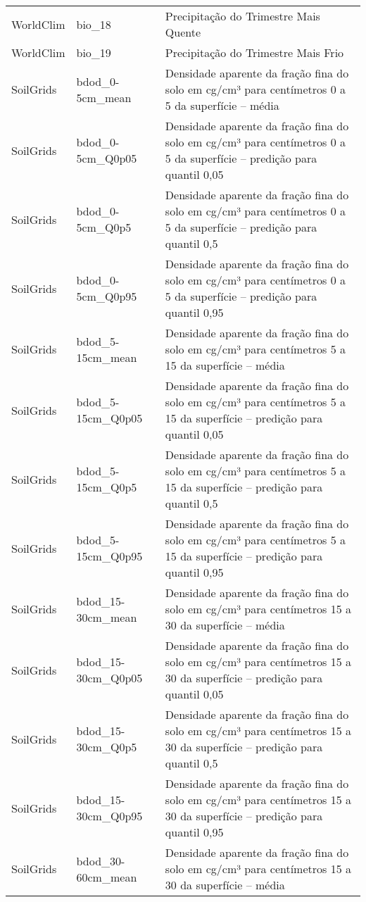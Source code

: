 \begin{longtable}{@{} p{4cm} p{4cm} p{8cm} @{}}
	WorldClim &
	bio\_18 &
	Precipitação do Trimestre Mais Quente \\
	WorldClim &
	bio\_19 &
	Precipitação do Trimestre Mais Frio \\
	SoilGrids &
	bdod\_0-5cm\_mean &
	Densidade aparente da fração fina do solo em cg/cm³ para centímetros 0 a 5 da superfície – média \\
	SoilGrids &
	bdod\_0-5cm\_Q0p05 &
	Densidade aparente da fração fina do solo em cg/cm³ para centímetros 0 a 5 da superfície – predição para quantil 0,05 \\
	SoilGrids &
	bdod\_0-5cm\_Q0p5 &
	Densidade aparente da fração fina do solo em cg/cm³ para centímetros 0 a 5 da superfície – predição para quantil 0,5 \\
	SoilGrids &
	bdod\_0-5cm\_Q0p95 &
	Densidade aparente da fração fina do solo em cg/cm³ para centímetros 0 a 5 da superfície – predição para quantil 0,95 \\
	SoilGrids &
	bdod\_5-15cm\_mean &
	Densidade aparente da fração fina do solo em cg/cm³ para centímetros 5 a 15 da superfície – média \\
	SoilGrids &
	bdod\_5-15cm\_Q0p05 &
	Densidade aparente da fração fina do solo em cg/cm³ para centímetros 5 a 15 da superfície – predição para quantil 0,05 \\
	SoilGrids &
	bdod\_5-15cm\_Q0p5 &
	Densidade aparente da fração fina do solo em cg/cm³ para centímetros 5 a 15 da superfície – predição para quantil 0,5 \\
	SoilGrids &
	bdod\_5-15cm\_Q0p95 &
	Densidade aparente da fração fina do solo em cg/cm³ para centímetros 5 a 15 da superfície – predição para quantil 0,95 \\
	SoilGrids &
	bdod\_15-30cm\_mean &
	Densidade aparente da fração fina do solo em cg/cm³ para centímetros 15 a 30 da superfície – média \\
	SoilGrids &
	bdod\_15-30cm\_Q0p05 &
	Densidade aparente da fração fina do solo em cg/cm³ para centímetros 15 a 30 da superfície – predição para quantil 0,05 \\
	SoilGrids &
	bdod\_15-30cm\_Q0p5 &
	Densidade aparente da fração fina do solo em cg/cm³ para centímetros 15 a 30 da superfície – predição para quantil 0,5 \\
	SoilGrids &
	bdod\_15-30cm\_Q0p95 &
	Densidade aparente da fração fina do solo em cg/cm³ para centímetros 15 a 30 da superfície – predição para quantil 0,95 \\
	SoilGrids &
	bdod\_30-60cm\_mean &
	Densidade aparente da fração fina do solo em cg/cm³ para centímetros 15 a 30 da superfície – média \\

\end{longtable}

